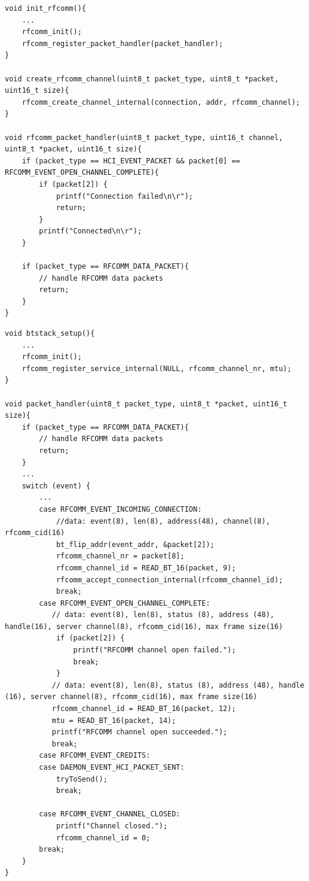 \begin{lstlisting}[float, caption=RFCOMM handler for outgoing RFCOMM channel., label=RFCOMMremoteService] 
void init_rfcomm(){
    ...
    rfcomm_init();
    rfcomm_register_packet_handler(packet_handler);
}

void create_rfcomm_channel(uint8_t packet_type, uint8_t *packet, uint16_t size){
    rfcomm_create_channel_internal(connection, addr, rfcomm_channel);
}

void rfcomm_packet_handler(uint8_t packet_type, uint16_t channel, uint8_t *packet, uint16_t size){
    if (packet_type == HCI_EVENT_PACKET && packet[0] == RFCOMM_EVENT_OPEN_CHANNEL_COMPLETE){
        if (packet[2]) {
            printf("Connection failed\n\r");
            return;
        }
        printf("Connected\n\r");
    }
    
    if (packet_type == RFCOMM_DATA_PACKET){
        // handle RFCOMM data packets
        return;
    }
}
\end{lstlisting}

\begin{lstlisting}[float, caption=Providing RFCOMM service., label=RFCOMMService]
void btstack_setup(){
    ...
    rfcomm_init();
    rfcomm_register_service_internal(NULL, rfcomm_channel_nr, mtu); 
}

void packet_handler(uint8_t packet_type, uint8_t *packet, uint16_t size){
    if (packet_type == RFCOMM_DATA_PACKET){
        // handle RFCOMM data packets
        return;
    }
    ...
    switch (event) {
        ...
        case RFCOMM_EVENT_INCOMING_CONNECTION:
            //data: event(8), len(8), address(48), channel(8), rfcomm_cid(16)
            bt_flip_addr(event_addr, &packet[2]); 
            rfcomm_channel_nr = packet[8];
            rfcomm_channel_id = READ_BT_16(packet, 9);
            rfcomm_accept_connection_internal(rfcomm_channel_id);
            break;
        case RFCOMM_EVENT_OPEN_CHANNEL_COMPLETE:
           // data: event(8), len(8), status (8), address (48), handle(16), server channel(8), rfcomm_cid(16), max frame size(16)
            if (packet[2]) {
                printf("RFCOMM channel open failed.");
                break;
            } 
           // data: event(8), len(8), status (8), address (48), handle (16), server channel(8), rfcomm_cid(16), max frame size(16)
           rfcomm_channel_id = READ_BT_16(packet, 12);
           mtu = READ_BT_16(packet, 14);
           printf("RFCOMM channel open succeeded.");
           break;
        case RFCOMM_EVENT_CREDITS:
        case DAEMON_EVENT_HCI_PACKET_SENT:
            tryToSend();
            break;

        case RFCOMM_EVENT_CHANNEL_CLOSED:
            printf("Channel closed.");
            rfcomm_channel_id = 0;
        break;
    }
}
\end{lstlisting}


